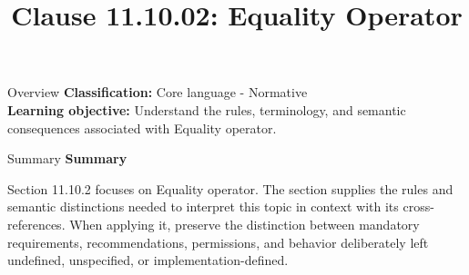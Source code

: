 \documentclass[10pt,letterpaper]{article}
\title{Clause 11.10.02: Equality Operator}
\author{}
\date{}
\begin{document}
\maketitle
\begin{CornellOverviewBox}{Overview}
\textbf{Classification:} Core language - Normative\\[2pt]
\textbf{Learning objective:} Understand the rules, terminology, and semantic consequences associated with Equality operator.
\end{CornellOverviewBox}\begin{CornellSummaryBox}{Summary}
{\sffamily\bfseries\color{Accent} Summary}\par\vspace{3pt}Section 11.10.2 focuses on Equality operator. The section supplies the rules and semantic distinctions needed to interpret this topic in context with its cross-references. When applying it, preserve the distinction between mandatory requirements, recommendations, permissions, and behavior deliberately left undefined, unspecified, or implementation-defined.
\end{CornellSummaryBox}
\end{document}
